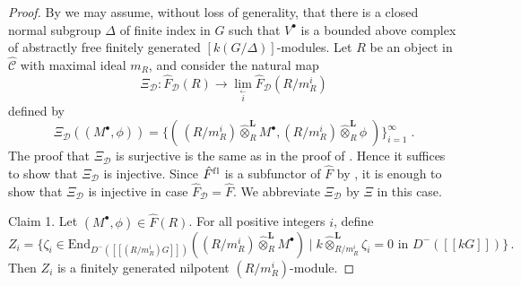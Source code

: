 \documentclass{amsart}
\theoremstyle{plain}
\theoremstyle{definition}
\theoremstyle{remark}
\begin{document}
\begin{proof}
By \cite[Prop. 2.12 and Cor. 3.6(i)]{bcderived} we may assume, without loss of generality,
that there is a closed normal subgroup $\Delta$ of finite index in $G$ such that
$V^\bullet$ is a bounded above complex of abstractly free finitely generated 
$[k(G/\Delta)]$-modules.
Let $R$ be an object in $\hat{\mathcal{C}}$ with maximal ideal $m_R$, and consider the natural map
\begin{equation}
\label{eq:themap}
\Xi_{\mathcal{D}}: \hat{F}_{\mathcal{D}}(R) \to \lim_{\stackrel{\longleftarrow}{i}}
\hat{F}_{\mathcal{D}}(R/m_R^i)
\end{equation}
defined by 
$$\Xi_{\mathcal{D}}((M^\bullet,\phi))= \{(\,(R/m_R^i) \hat{\otimes}^{\mathbf{L}}_R
M^\bullet,(R/m_R^i) \hat{\otimes}^{\mathbf{L}}_R\phi \;)\}_{i=1}^\infty\;.$$
The proof that $\Xi_{\mathcal{D}}$ is surjective is the same as in the proof of \cite[Prop. 7.2]{bcderived}.
Hence it suffices to show that $\Xi_{\mathcal{D}}$ is injective. Since $\hat{F}^{\mathrm{f\/l}}$
is a subfunctor of $\hat{F}$ by \cite[Prop. 2.12]{bcderived}, it is enough
to show that $\Xi_{\mathcal{D}}$ is injective in case $\hat{F}_{\mathcal{D}}
=\hat{F}$. We abbreviate $\Xi_{\mathcal{D}}$ by $\Xi$ in this case.

\medskip

\noindent
{\sc Claim 1.} Let $(M^\bullet, \phi)\in \hat{F}(R)$. For all positive integers $i$, define
$$Z_i=\{\zeta_i\in\mathrm{End}_{D^-([[(R/m_R^i)G]])}((R/m_R^i)\hat{\otimes}^{\mathbf{L}}_R {M}^\bullet)\;
|\;k\hat{\otimes}^{\mathbf{L}}_{R/m_R^{i}}\zeta_i=0\mbox{ in } D^-([[kG]])\}\,.$$
Then $Z_i$ is a finitely generated nilpotent $(R/m_R^i)$-module.

\medskip


\end{proof}
\end{document}
